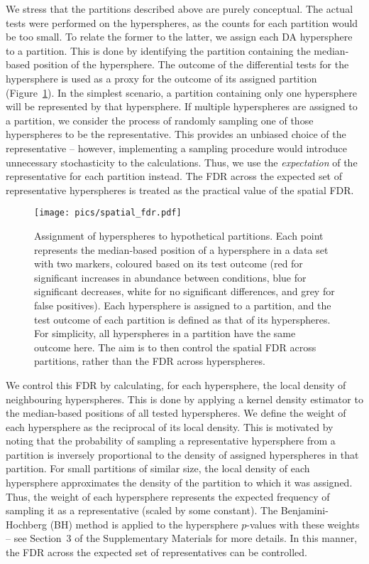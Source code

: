 \documentclass{article}
\newcommand{\suppfdr}{3}
\begin{document}
We stress that the partitions described above are purely conceptual.
The actual tests were performed on the hyperspheres, as the counts for each partition would be too small.
To relate the former to the latter, we assign each DA hypersphere to a partition.
This is done by identifying the partition containing the median-based position of the hypersphere.
The outcome of the differential tests for the hypersphere is used as a proxy for the outcome of its assigned partition (Figure~\ref{fig:fdrdemo}).
In the simplest scenario, a partition containing only one hypersphere will be represented by that hypersphere.
If multiple hyperspheres are assigned to a partition, we consider the process of randomly sampling one of those hyperspheres to be the representative.
This provides an unbiased choice of the representative -- however, implementing a sampling procedure would introduce unnecessary stochasticity to the calculations.
Thus, we use the \textit{expectation} of the representative for each partition instead.
The FDR across the expected set of representative hyperspheres is treated as the practical value of the spatial FDR.  

\begin{figure}[bt]
    \begin{center}
        \texttt{[image: pics/spatial\_fdr.pdf]}
    \end{center}
    \caption{
        Assignment of hyperspheres to hypothetical partitions.
        Each point represents the median-based position of a hypersphere in a data set with two markers, coloured based on its test outcome
        (red for significant increases in abundance between conditions, blue for significant decreases, white for no significant differences, and grey for false positives).
        Each hypersphere is assigned to a partition, and the test outcome of each partition is defined as that of its hyperspheres.
        For simplicity, all hyperspheres in a partition have the same outcome here.
        The aim is to then control the spatial FDR across partitions, rather than the FDR across hyperspheres.
    }
    \label{fig:fdrdemo}
\end{figure}

We control this FDR by calculating, for each hypersphere, the local density of neighbouring hyperspheres.
This is done by applying a kernel density estimator to the median-based positions of all tested hyperspheres.
We define the weight of each hypersphere as the reciprocal of its local density.
This is motivated by noting that the probability of sampling a representative hypersphere from a partition is inversely proportional to the density of assigned hyperspheres in that partition.
For small partitions of similar size, the local density of each hypersphere approximates the density of the partition to which it was assigned.
Thus, the weight of each hypersphere represents the expected frequency of sampling it as a representative (scaled by some constant).
The Benjamini-Hochberg (BH) method is applied to the hypersphere $p$-values with these weights -- see Section~\suppfdr{} of the Supplementary Materials for more details.
In this manner, the FDR across the expected set of representatives can be controlled.
\end{document}
